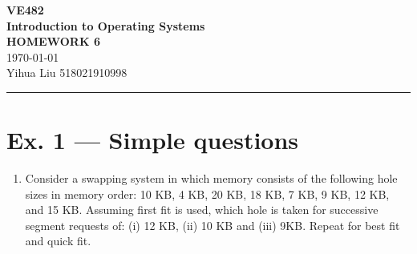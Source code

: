 \documentclass[a4paper]{article}
\begin{document}
\begin{center}
    \huge
    \textbf{VE482\\Introduction to Operating Systems\\}
    \Large
    \vspace{15pt}
    \uppercase{\textbf{Homework 6}}\\
    \large
    \vspace{5pt}\today\\
    \vspace{5pt}
    Yihua Liu 518021910998
    \vspace{5pt}
    \rule[-5pt]{.97\linewidth}{0.05em}
\end{center}
\section*{Ex. 1 — Simple questions}
\begin{enumerate}
    \item Consider a swapping system in which memory consists of the following hole sizes in memory order: 10 KB, 4 KB, 20 KB, 18 KB, 7 KB, 9 KB, 12 KB, and 15 KB. Assuming first fit is used, which hole is taken for successive segment requests of: (i) 12 KB, (ii) 10 KB and (iii) 9KB. Repeat for best fit and quick fit.
\end{enumerate}
\end{document}
